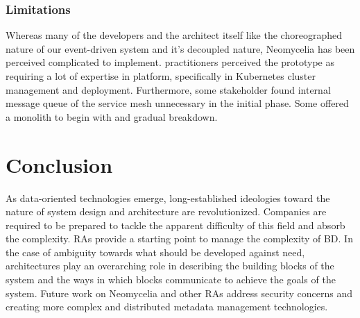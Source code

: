 \documentclass[10pt, conference]{IEEEtran}
\begin{document}
\subsubsection{Limitations}

Whereas many of the developers and the architect itself like the choreographed nature of our event-driven system and it's decoupled nature, Neomycelia has been perceived complicated to implement. practitioners perceived the prototype as requiring a lot of expertise in platform, specifically in Kubernetes cluster management and deployment. Furthermore, some stakeholder found internal message queue of the service mesh unnecessary in the initial phase. Some offered a monolith to begin with and gradual breakdown.

\section{Conclusion}

As data-oriented technologies emerge, long-established ideologies toward the nature of system design and architecture are revolutionized. Companies are required to be prepared to tackle the apparent difficulty of this field and absorb the complexity. RAs provide a starting point to manage the complexity of BD. In the case of ambiguity towards what should be developed against need, architectures play an overarching role in describing the building blocks of the system and the ways in which blocks communicate to achieve the goals of the system. Future work on Neomycelia and other RAs address security concerns and creating more complex and distributed metadata management technologies.



\end{document}
